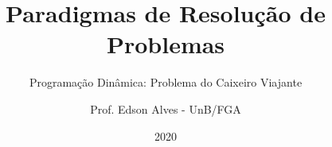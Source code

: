 \title{Paradigmas de Resolução de Problemas}
\subtitle{Programação Dinâmica: Problema do Caixeiro Viajante}
\author{Prof. Edson Alves - UnB/FGA}
\date{2020}

